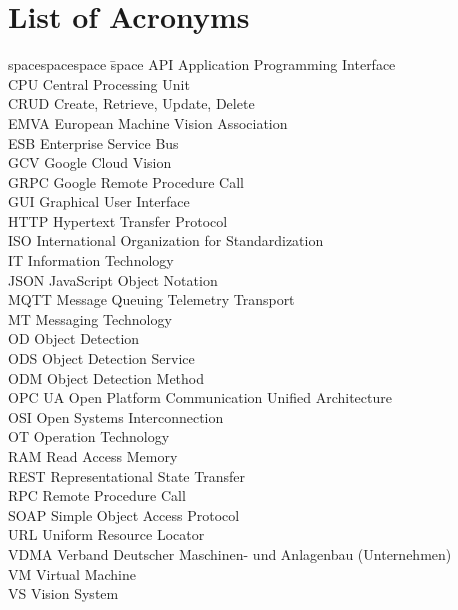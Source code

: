 \chapter*{List of Acronyms}
\thispagestyle{empty}
\begin{tabbing}
spacespacespace \= space \kill
API	 \> 	Application Programming Interface	 \\
CPU	 \> 	Central Processing Unit	 \\
CRUD	 \> 	Create, Retrieve, Update, Delete	 \\
EMVA \> European Machine Vision Association\\
ESB	\>	Enterprise Service Bus \\
GCV	\>	Google Cloud Vision \\
GRPC     \>  Google Remote Procedure Call\\
GUI	\>	Graphical User Interface \\
HTTP	 \> 	Hypertext Transfer Protocol	 \\
ISO    \>  International Organization for Standardization\\
IT  \>  Information Technology\\
JSON	\>	JavaScript Object Notation \\
MQTT     \>  Message Queuing Telemetry Transport\\
MT      \> Messaging Technology\\
OD     \>  Object Detection\\
ODS     \>  Object Detection Service\\
ODM     \>  Object Detection Method\\
OPC UA     \>  Open Platform Communication Unified Architecture\\
OSI     \>  Open Systems Interconnection\\
OT  \> Operation Technology\\
RAM    \> Read Access Memory \\
REST    \> Representational State Transfer \\
RPC    \> Remote Procedure Call \\
SOAP	 \> 	Simple Object Access Protocol	 \\
URL	 \> 	Uniform Resource Locator	 \\
VDMA \>     Verband Deutscher Maschinen- und Anlagenbau (Unternehmen) \\
VM	 \> 	Virtual Machine	 \\
VS  \>  Vision System\\
\end{tabbing}
\endinput
